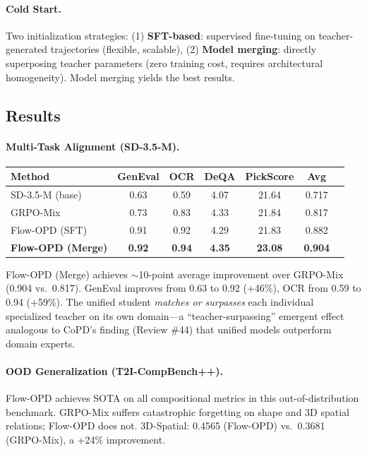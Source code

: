 \documentclass[11pt]{article}
\begin{document}
\paragraph{Cold Start.}
Two initialization strategies: (1) \textbf{SFT-based}: supervised fine-tuning on teacher-generated trajectories (flexible, scalable), (2) \textbf{Model merging}: directly superposing teacher parameters (zero training cost, requires architectural homogeneity). Model merging yields the best results.

\subsection{Results}

\paragraph{Multi-Task Alignment (SD-3.5-M).}

\begin{center}
\begin{tabular}{lcccccc}
\toprule
\textbf{Method} & \textbf{GenEval} & \textbf{OCR} & \textbf{DeQA} & \textbf{PickScore} & \textbf{Avg} \\
\midrule
SD-3.5-M (base) & 0.63 & 0.59 & 4.07 & 21.64 & 0.717 \\
GRPO-Mix & 0.73 & 0.83 & 4.33 & 21.84 & 0.817 \\
Flow-OPD (SFT) & 0.91 & 0.92 & 4.29 & 21.83 & 0.882 \\
\textbf{Flow-OPD (Merge)} & \textbf{0.92} & \textbf{0.94} & \textbf{4.35} & \textbf{23.08} & \textbf{0.904} \\
\bottomrule
\end{tabular}
\end{center}

Flow-OPD (Merge) achieves $\sim$10-point average improvement over GRPO-Mix (0.904 vs.\ 0.817). GenEval improves from 0.63 to 0.92 (+46\%), OCR from 0.59 to 0.94 (+59\%). The unified student \emph{matches or surpasses} each individual specialized teacher on its own domain---a ``teacher-surpassing'' emergent effect analogous to CoPD's finding (Review \#44) that unified models outperform domain experts.

\paragraph{OOD Generalization (T2I-CompBench++).}
Flow-OPD achieves SOTA on all compositional metrics in this out-of-distribution benchmark. GRPO-Mix suffers catastrophic forgetting on shape and 3D spatial relations; Flow-OPD does not. 3D-Spatial: 0.4565 (Flow-OPD) vs.\ 0.3681 (GRPO-Mix), a +24\% improvement.
\end{document}
